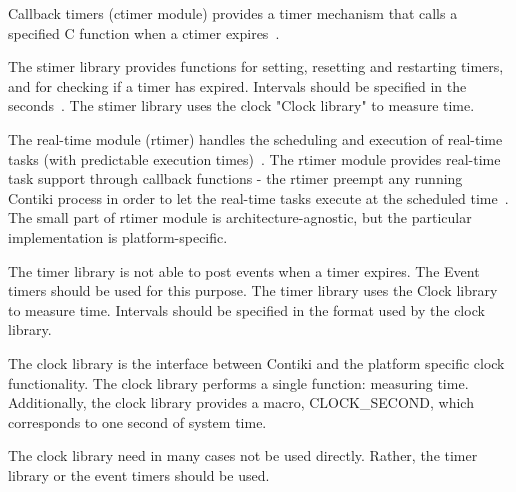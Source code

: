 Callback timers (ctimer module) provides a timer mechanism that calls a specified
C function when a ctimer expires~\cite{contiki-docs}.

The stimer library provides functions for setting, resetting and
restarting timers, and for checking if a timer has expired.
Intervals should be specified in the seconds~\cite{contiki-docs}.
The stimer library uses the clock "Clock library" to
measure time.

The real-time module (rtimer) handles the scheduling and execution of
real-time tasks (with predictable execution times)~\cite{contiki-docs}.
The rtimer module provides real-time task support through callback functions -
the rtimer preempt any running Contiki process in order to let the real-time tasks
execute at the scheduled time~\cite{contiki-wiki-timers}.
The small part of rtimer module is architecture-agnostic,
but the particular implementation is platform-specific.




The timer library is not able to post events when a timer expires. The Event timers should be used for this purpose.
The timer library uses the Clock library to measure time. Intervals should be specified in the format used by the clock library.

The clock library is the interface between Contiki and the platform specific clock functionality.
The clock library performs a single function: measuring time.
Additionally, the clock library provides a macro, CLOCK\_SECOND, which corresponds to one second of system time.

The clock library need in many cases not be used directly. Rather, the timer library or the event timers should be used.
